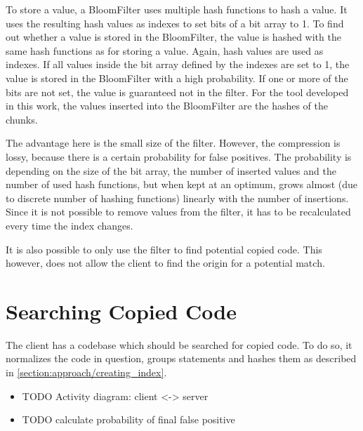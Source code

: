 To store a value, a BloomFilter uses multiple hash functions to hash a value\cite{bloom1970filter}.
It uses the resulting hash values as indexes to set bits of a bit array to 1.
To find out whether a value is stored in the BloomFilter, the value is hashed with the same hash functions as for storing a value.
Again, hash values are used as indexes.
If all values inside the bit array defined by the indexes are set to 1, the value is stored in the BloomFilter with a high probability.
If one or more of the bits are not set, the value is guaranteed not in the filter.
For the tool developed in this work, the values inserted into the BloomFilter are the hashes of the chunks.


The advantage here is the small size of the filter.
However, the compression is lossy, because there is a certain probability for false positives.
The probability is depending on the size of the bit array, the number of inserted values and the number of used hash functions, but when kept at an optimum, grows almost (due to discrete number of hashing functions) linearly with the number of insertions.
Since it is not possible to remove values from the filter, it has to be recalculated every time the index changes.

It is also possible to only use the filter to find potential copied code.
This however, does not allow the client to find the origin for a potential match.
	
\section{Searching Copied Code}\label{section:approach/searching_copied_code}
The client has a codebase which should be searched for copied code.
To do so, it normalizes the code in question, groups statements and hashes them as described in \autoref{section:approach/creating_index}.
\begin{itemize}
	\item TODO Activity diagram: client <-> server
	\item TODO calculate probability of final false positive
\end{itemize}

